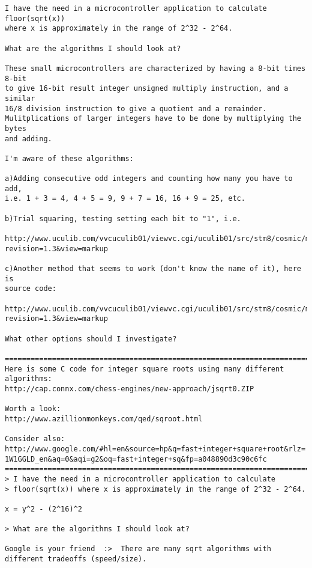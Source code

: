 \begin{tiny}
\begin{verbatim}
I have the need in a microcontroller application to calculate floor(sqrt(x)) 
where x is approximately in the range of 2^32 - 2^64.

What are the algorithms I should look at?

These small microcontrollers are characterized by having a 8-bit times 8-bit 
to give 16-bit result integer unsigned multiply instruction, and a similar 
16/8 division instruction to give a quotient and a remainder. 
Mulitplications of larger integers have to be done by multiplying the bytes 
and adding.

I'm aware of these algorithms:

a)Adding consecutive odd integers and counting how many you have to add, 
i.e. 1 + 3 = 4, 4 + 5 = 9, 9 + 7 = 16, 16 + 9 = 25, etc.

b)Trial squaring, testing setting each bit to "1", i.e.

http://www.uculib.com/vvcuculib01/viewvc.cgi/uculib01/src/stm8/cosmic/modxx/atu8sqrtfrxx/src/atu8sqrtfrxx.c?revision=1.3&view=markup

c)Another method that seems to work (don't know the name of it), here is 
source code:

http://www.uculib.com/vvcuculib01/viewvc.cgi/uculib01/src/stm8/cosmic/modxx/atu16sqrtx10frxx/src/atu16sqrtx10frxx.c?revision=1.3&view=markup

What other options should I investigate?

================================================================================
Here is some C code for integer square roots using many different 
algorithms:
http://cap.connx.com/chess-engines/new-approach/jsqrt0.ZIP

Worth a look:
http://www.azillionmonkeys.com/qed/sqroot.html

Consider also:
http://www.google.com/#hl=en&source=hp&q=fast+integer+square+root&rlz=
1W1GGLD_en&aq=0&aqi=g2&oq=fast+integer+sq&fp=a048890d3c90c6fc
================================================================================
> I have the need in a microcontroller application to calculate 
> floor(sqrt(x)) where x is approximately in the range of 2^32 - 2^64.

x = y^2 - (2^16)^2

> What are the algorithms I should look at?

Google is your friend  :>  There are many sqrt algorithms with
different tradeoffs (speed/size).


\end{verbatim}
\end{tiny}

